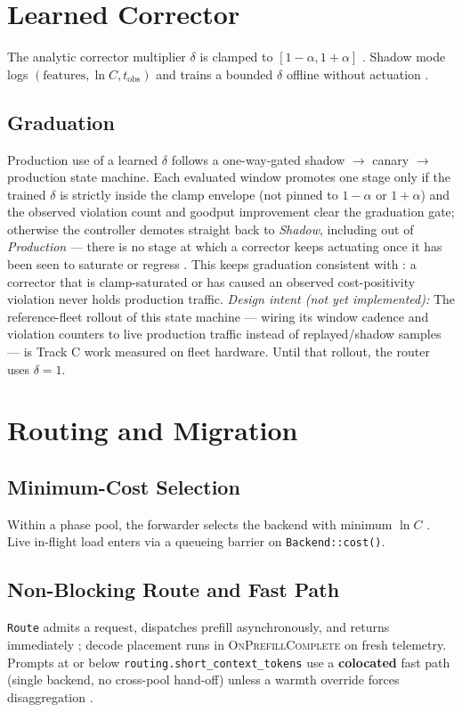 \documentclass[11pt]{article}
\newcommand{\intent}[1]{\textit{Design intent (not yet implemented):} #1}
\begin{document}
\section{Learned Corrector}\label{sec:corrector}
The analytic corrector multiplier $\delta$ is clamped to $[1-\alpha,1+\alpha]$
. Shadow mode logs $(\text{features}, \ln C, t_{\mathrm{obs}})$
and trains a bounded $\delta$ offline without actuation .

\subsection{Graduation}\label{sec:corrector-grad}
Production use of a learned $\delta$ follows a one-way-gated
shadow $\to$ canary $\to$ production state machine. Each evaluated window
promotes one stage only if the trained $\delta$ is strictly inside the
clamp envelope (not pinned to $1-\alpha$ or $1+\alpha$) and the observed
violation count and goodput improvement clear the graduation gate;
otherwise the controller demotes straight back to \emph{Shadow}, including
out of \emph{Production} — there is no stage at which a corrector keeps
actuating once it has been seen to saturate or regress
. This keeps graduation consistent with
: a corrector that is clamp-saturated or has caused an
observed cost-positivity violation never holds production traffic.
\intent{The reference-fleet rollout of this state machine — wiring its
window cadence and violation counters to live production traffic instead
of replayed/shadow samples — is Track C work measured on fleet hardware.
Until that rollout, the router uses $\delta=1$.}

\section{Routing and Migration}\label{sec:routing}

\subsection{Minimum-Cost Selection}\label{sec:route-mincost}
Within a phase pool, the forwarder selects the backend with minimum $\ln C$
. Live in-flight load enters via a queueing barrier on
\texttt{Backend::cost()}.

\subsection{Non-Blocking Route and Fast Path}\label{sec:route}
\texttt{Route} admits a request, dispatches prefill asynchronously, and
returns immediately ; decode placement runs in
\textsc{OnPrefillComplete} on fresh telemetry. Prompts at or below
\texttt{routing.short\_context\_tokens} use a \textbf{colocated} fast path
(single backend, no cross-pool hand-off) unless a warmth override forces
disaggregation .
\end{document}
